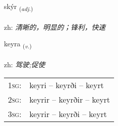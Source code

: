 \documentclass[frontgrid, backgrid]{flacards}\usepackage[]{graphicx}\usepackage[]{color}
\begin{document}
\renewcommand{\flhead}{\vskip5pt \fboxsep=0pt {\small\bfseries\footnotesize Lýsingarorð | 形容词}}
\renewcommand{\fcfoot}{\vskip5pt \fboxsep=0pt \hspace{2pt}{\small\bfseries\footnotesize 2K}}

\renewcommand{\blhead}{\vskip5pt {\small\bfseries\footnotesize Lýsingarorð | 形容词 }}
\renewcommand{\bcfoot}{\vskip5pt \hspace{2pt}{\small\bfseries\footnotesize 2K}}


{skýr \small{\textsubscript{(\textit{adj.})}} \\[1ex] %
\textphonetic{[sciːr]} \\
zh: \emph{清晰的，明显的；锋利，快速} \\  [2ex]
\renewcommand*{\arraystretch}{0.8}
}

\renewcommand{\flhead}{\vskip5pt \fboxsep=0pt {\small\bfseries\footnotesize Sagnorð | 动词}}
\renewcommand{\fcfoot}{\vskip5pt \fboxsep=0pt \hspace{2pt}{\small\bfseries\footnotesize 2K}}

\renewcommand{\blhead}{\vskip5pt {\small\bfseries\footnotesize Sagnorð | 动词 }}
\renewcommand{\bcfoot}{\vskip5pt \hspace{2pt}{\small\bfseries\footnotesize 2K}}


{keyra \small{\textsubscript{(\textit{v.})}} \\[1ex] %
\textphonetic{[cʰeiːra]} \\
zh: \emph{驾驶;促使} \\  [2ex]
\renewcommand*{\arraystretch}{0.8}
\begin{tabular}{p{1cm}l}
\textsc{1sg}: & keyri -- keyrði -- keyrt \\ 
\textsc{2sg}: & keyrir -- keyrðir -- keyrt \\ 
\textsc{3sg}: & keyrir -- keyrði -- keyrt \\ 
\end{tabular}
}
\end{document}
